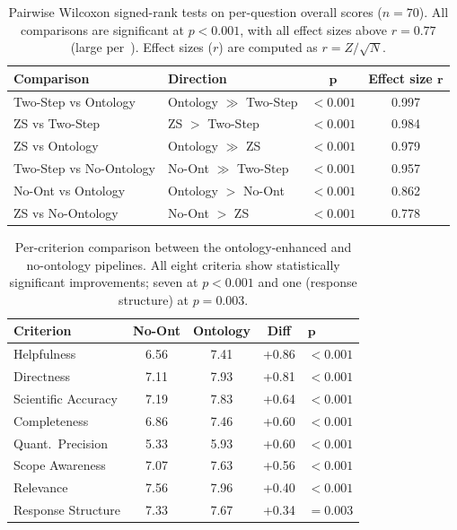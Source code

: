 \begin{table}[htbp]
\centering
\caption{Pairwise Wilcoxon signed-rank tests on per-question overall scores
($n = 70$). All comparisons are significant at $p < 0.001$, with all
effect sizes above $r = 0.77$ (large per~\citet{kerby2014simple}). Effect
sizes ($r$) are computed as $r = Z / \sqrt{N}$.}
\label{tab:pairwise-tests}
\begin{tabular}{llcc}
\toprule
\textbf{Comparison} & \textbf{Direction} & $\boldsymbol{p}$ & \textbf{Effect size} $\boldsymbol{r}$ \\
\midrule
Two-Step vs Ontology & Ontology $\gg$ Two-Step & $< 0.001$ & 0.997 \\
ZS vs Two-Step & ZS $>$ Two-Step & $< 0.001$ & 0.984 \\
ZS vs Ontology & Ontology $\gg$ ZS & $< 0.001$ & 0.979 \\
Two-Step vs No-Ontology & No-Ont $\gg$ Two-Step & $< 0.001$ & 0.957 \\
No-Ont vs Ontology & Ontology $>$ No-Ont & $< 0.001$ & 0.862 \\
ZS vs No-Ontology & No-Ont $>$ ZS & $< 0.001$ & 0.778 \\
\bottomrule
\end{tabular}
\end{table}

\begin{table}[htbp]
\centering
\caption{Per-criterion comparison between the ontology-enhanced and
no-ontology pipelines. All eight criteria show statistically significant
improvements; seven at $p < 0.001$ and one (response structure) at
$p = 0.003$.}
\label{tab:ont-vs-noont-criteria}
\small
\begin{tabular}{lcccl}
\toprule
\textbf{Criterion} & \textbf{No-Ont} & \textbf{Ontology} & \textbf{Diff}
& $\boldsymbol{p}$ \\
\midrule
Helpfulness & 6.56 & 7.41 & +0.86 & $< 0.001$ \\
Directness & 7.11 & 7.93 & +0.81 & $< 0.001$ \\
Scientific Accuracy & 7.19 & 7.83 & +0.64 & $< 0.001$ \\
Completeness & 6.86 & 7.46 & +0.60 & $< 0.001$ \\
Quant.\ Precision & 5.33 & 5.93 & +0.60 & $< 0.001$ \\
Scope Awareness & 7.07 & 7.63 & +0.56 & $< 0.001$ \\
Relevance & 7.56 & 7.96 & +0.40 & $< 0.001$ \\
Response Structure & 7.33 & 7.67 & +0.34 & $= 0.003$ \\
\bottomrule
\end{tabular}
\end{table}


